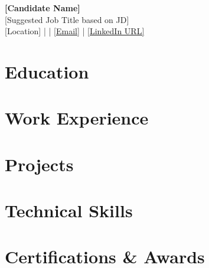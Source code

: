 \documentclass[letterpaper,11pt]{article}
\begin{document}
\begin{center}
  {\LARGE \textbf{[Candidate Name]}}\\
  {\normalsize [Suggested Job Title based on JD]}\\
  \small
  [Location]
  \quad | \quad
  [Phone]
  \quad | \quad
  \href{mailto:[Email]}{[Email]}
  \quad | \quad
  \href{[LinkedIn URL]}{[LinkedIn URL]}
\end{center}
\vspace{-13pt}

\section*{Education}

\section*{Work Experience}

\section*{Projects}

\section*{Technical Skills}

\section*{Certifications \& Awards}
\end{document}
